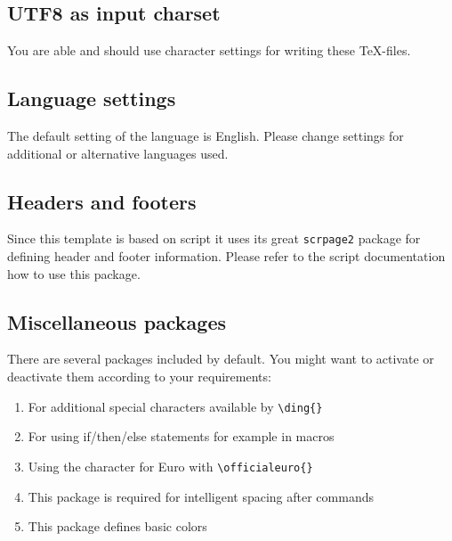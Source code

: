 \subsection{UTF8 as input charset}

You are able and should use  character settings for writing these \TeX{}-files.


\subsection{Language settings}

The default setting of the language is English. Please change settings for
additional or alternative languages used.


\subsection{Headers and footers}

Since this template is based on  script it uses its great \texttt{scrpage2}
package for defining header and footer information. Please refer to the 
script documentation how to use this package.


\subsection{Miscellaneous packages} \label{subsec:miscpackages}

There are several packages included by default. You might want to activate or
deactivate them according to your requirements:

\begin{enumerate}
\item[\texttt{\href{https://secure.wikimedia.org/wikibooks/en/wiki/LaTeX/Formatting\#Other\_symbols}{%
pifont%
}}] 
For additional special characters available by \verb#\ding{}#
\item[\texttt{\href{http://ctan.org/pkg/ifthen}{%
ifthen%
}}] 
For using if/then/else statements for example in macros
\item[\texttt{\href{http://www.ctan.org/tex-archive/fonts/eurosym}{%
eurosym%
}}] 
Using the character for Euro with \verb#\officialeuro{}#
\item[\texttt{\href{http://www.ctan.org/tex-archive/help/Catalogue/entries/xspace.html}{%
xspace%
}}] 
This package is required for intelligent spacing after commands
\item[\texttt{\href{https://secure.wikimedia.org/wikibooks/en/wiki/LaTeX/Colors}{%
color%
}}] 
This package defines basic colors
\end{enumerate}

